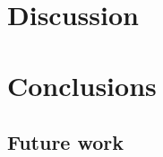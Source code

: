 \documentclass{cslthse-msc}
\begin{document}

\chapter{Discussion}

\chapter{Conclusions}

\section{Future work}
   
\end{document}
